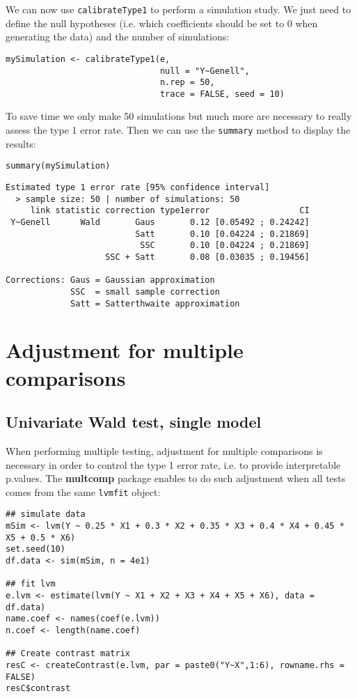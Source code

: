 \documentclass[12pt]{article}
\begin{document}
We can now use \texttt{calibrateType1} to perform a simulation study. We just
need to define the null hypotheses (i.e. which coefficients should be
set to 0 when generating the data) and the number of simulations:
\lstset{language=r,label= ,caption= ,captionpos=b,numbers=none}
\begin{lstlisting}
mySimulation <- calibrateType1(e, 
							   null = "Y~Genell",
							   n.rep = 50, 
							   trace = FALSE, seed = 10)
\end{lstlisting}

To save time we only make 50 simulations but much more are necessary
to really assess the type 1 error rate. Then we can use the \texttt{summary}
method to display the results:
\lstset{language=r,label= ,caption= ,captionpos=b,numbers=none}
\begin{lstlisting}
summary(mySimulation)
\end{lstlisting}

\begin{verbatim}
Estimated type 1 error rate [95% confidence interval] 
  > sample size: 50 | number of simulations: 50
     link statistic correction type1error                  CI
 Y~Genell      Wald       Gaus       0.12 [0.05492 ; 0.24242]
                          Satt       0.10 [0.04224 ; 0.21869]
                           SSC       0.10 [0.04224 ; 0.21869]
                    SSC + Satt       0.08 [0.03035 ; 0.19456]

Corrections: Gaus = Gaussian approximation 
             SSC  = small sample correction 
             Satt = Satterthwaite approximation
\end{verbatim}


\clearpage

\section{Adjustment for multiple comparisons}
\label{sec:org6609fde}
\subsection{Univariate Wald test, single model}
\label{sec:org5609a6f}

When performing multiple testing, adjustment for multiple comparisons
is necessary in order to control the type 1 error rate, i.e. to
provide interpretable p.values. The \textbf{multcomp} package enables to do
such adjustment when all tests comes from the same \texttt{lvmfit} object:
\lstset{language=r,label= ,caption= ,captionpos=b,numbers=none}
\begin{lstlisting}
## simulate data
mSim <- lvm(Y ~ 0.25 * X1 + 0.3 * X2 + 0.35 * X3 + 0.4 * X4 + 0.45 * X5 + 0.5 * X6)
set.seed(10)
df.data <- sim(mSim, n = 4e1)

## fit lvm
e.lvm <- estimate(lvm(Y ~ X1 + X2 + X3 + X4 + X5 + X6), data = df.data)
name.coef <- names(coef(e.lvm))
n.coef <- length(name.coef)

## Create contrast matrix
resC <- createContrast(e.lvm, par = paste0("Y~X",1:6), rowname.rhs = FALSE)
resC$contrast
\end{lstlisting}
\end{document}
